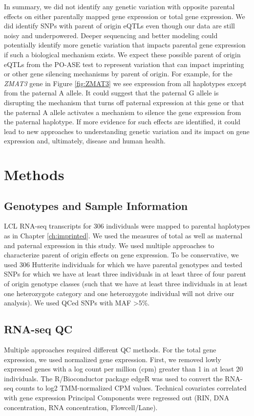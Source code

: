 In summary, we did not identify any genetic variation with opposite parental effects on either parentally mapped gene expression or total gene expression. We did identify SNPs with parent of origin eQTLs even though our data are still noisy and underpowered. Deeper sequencing and better modeling could potentially identify more genetic variation that impacts parental gene expression if such a biological mechanism exists. We expect these possible parent of origin eQTLs from the PO-ASE test to represent variation that can impact imprinting or other gene silencing mechanisms by parent of origin. For example, for the \emph{ZMAT3} gene in Figure \ref{fig:ZMAT3} we see expression from all haplotypes except from the paternal A allele. It could suggest that the paternal G allele is disrupting the mechanism that turns off paternal expression at this gene or that the paternal A allele activates a mechanism to silence the gene expression from the paternal haplotype. If more evidence for such effects are identified, it could lead to new approaches to understanding genetic variation and its impact on gene expression and, ultimately, disease and human health. 

\section{Methods}\label{ch04-methods}

\subsection{Genotypes and Sample Information}\label{Genotypes and Sample Information}
LCL RNA-seq transcripts for 306 individuals were mapped to parental haplotypes as in Chapter \ref{ch:imprinted}. We used the measures of total as well as maternal and paternal expression in this study. We used multiple approaches to characterize parent of origin effects on gene expression. To be conservative, we used 306 Hutterite individuals for which we have parental genotypes and tested SNPs for which we have at least three individuals in at least three of four parent of origin genotype classes (such that we have at least three individuals in at least one heterozygote category and one heterozygote individual will not drive our analysis). We used QCed SNPs with MAF \textgreater 5\%.

\subsection{RNA-seq QC}\label{RNA-seq QC}
Multiple approaches required different QC methods. For the total gene expression, we used normalized gene expression. First, we removed lowly expressed genes with a log count per million (cpm) greater than 1 in at least 20 individuals. The R/Bioconductor package edgeR was used to convert the RNA-seq counts to log2 TMM-normalized CPM values\cite{Robinson:2010dd,Robinson:2010cw}. Technical covariates correlated with gene expression Principal Components were regressed out (RIN, DNA concentration, RNA concentration, Flowcell/Lane). 

